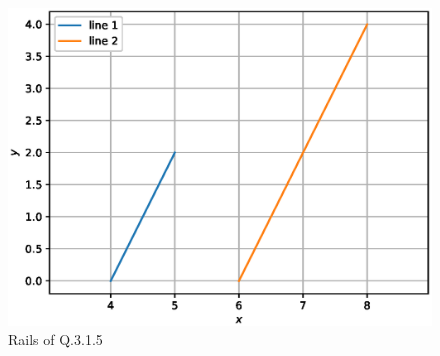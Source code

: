 \begin{enumerate}[label=\thesection.\arabic*.,ref=\thesection.\theenumi]
\begin{figure}[!ht]
	\includegraphics[width=\columnwidth]{./figs/lines/q5.eps}
	\caption{Rails of Q.3.1.5}
	\label{fig:qfive}	
	\end{figure}
	
\end{enumerate}

